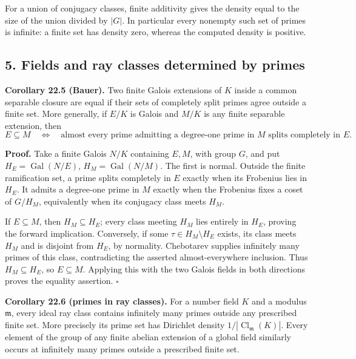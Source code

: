 \documentclass[11pt,a4paper]{article}
\begin{document}
For a union of conjugacy classes, finite additivity gives the density
equal to the size of the union divided by \(|G|\). In particular every
nonempty such set of primes is infinite: a finite set has density zero,
whereas the computed density is positive.

\subsection{5. Fields and ray classes determined by
primes}\label{fields-and-ray-classes-determined-by-primes}

\textbf{Corollary 22.5 (Bauer).} Two finite Galois extensions of \(K\)
inside a common separable closure are equal if their sets of completely
split primes agree outside a finite set. More generally, if \(E/K\) is
Galois and \(M/K\) is any finite separable extension, then \[
E\subseteq M
\quad\Longleftrightarrow\quad
\text{almost every prime admitting a degree-one prime in }M
\text{ splits completely in }E.
\tag{14}
\]

\textbf{Proof.} Take a finite Galois \(N/K\) containing \(E,M\), with
group \(G\), and put \(H_E=\operatorname{Gal}(N/E)\),
\(H_M=\operatorname{Gal}(N/M)\). The first is normal. Outside the finite
ramification set, a prime splits completely in \(E\) exactly when its
Frobenius lies in \(H_E\). It admits a degree-one prime in \(M\) exactly
when the Frobenius fixes a coset of \(G/H_M\), equivalently when its
conjugacy class meets \(H_M\).

If \(E\subseteq M\), then \(H_M\subseteq H_E\); every class meeting
\(H_M\) lies entirely in \(H_E\), proving the forward implication.
Conversely, if some \(\tau\in H_M\setminus H_E\) exists, its class meets
\(H_M\) and is disjoint from \(H_E\), by normality. Chebotarev supplies
infinitely many primes of this class, contradicting the asserted
almost-everywhere inclusion. Thus \(H_M\subseteq H_E\), so
\(E\subseteq M\). Applying this with the two Galois fields in both
directions proves the equality assertion. \(\square\)

\textbf{Corollary 22.6 (primes in ray classes).} For a number field
\(K\) and a modulus \(\mathfrak m\), every ideal ray class contains
infinitely many primes outside any prescribed finite set. More precisely
its prime set has Dirichlet density
\(1/|\operatorname{Cl}_{\mathfrak m}(K)|\). Every element of the group
of any finite abelian extension of a global field similarly occurs at
infinitely many primes outside a prescribed finite set.
\end{document}

